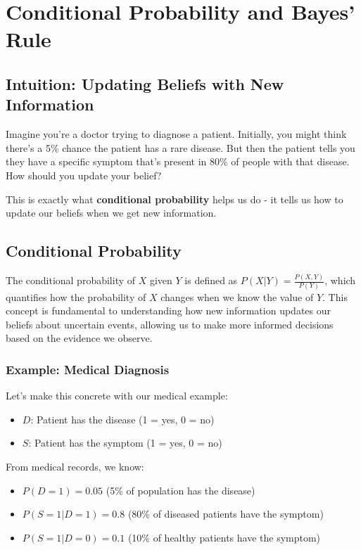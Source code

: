 
\section{Conditional Probability and Bayes' Rule }
\label{sec:conditional-probability}

\subsection{Intuition: Updating Beliefs with New Information}

Imagine you're a doctor trying to diagnose a patient. Initially, you might think there's a 5\% chance the patient has a rare disease. But then the patient tells you they have a specific symptom that's present in 80\% of people with that disease. How should you update your belief?

This is exactly what \textbf{conditional probability} helps us do - it tells us how to update our beliefs when we get new information.

\subsection{Conditional Probability}

The conditional probability of $X$ given $Y$ is defined as $P(X|Y) = \frac{P(X, Y)}{P(Y)}$, which quantifies how the probability of $X$ changes when we know the value of $Y$. This concept is fundamental to understanding how new information updates our beliefs about uncertain events, allowing us to make more informed decisions based on the evidence we observe.

\subsubsection{Example: Medical Diagnosis}

Let's make this concrete with our medical example:
\begin{itemize}
    \item $D$: Patient has the disease (1 = yes, 0 = no)
    \item $S$: Patient has the symptom (1 = yes, 0 = no)
\end{itemize}

From medical records, we know:
\begin{itemize}
    \item $P(D=1) = 0.05$ (5\% of population has the disease)
    \item $P(S=1|D=1) = 0.8$ (80\% of diseased patients have the symptom)
    \item $P(S=1|D=0) = 0.1$ (10\% of healthy patients have the symptom)
\end{itemize}

